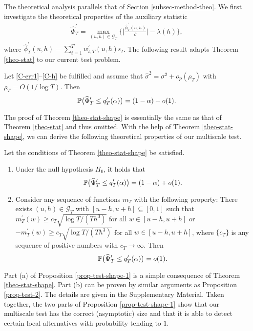 The theoretical analysis parallels that of Section \ref{subsec-method-theo}. We first investigate the theoretical properties of the auxiliary statistic 
\begin{align*}
\widehat{\Phi}_T^\prime = \max_{(u,h) \in \mathcal{G}_T} \Big\{ \Big| \frac{\widehat{\phi}_T^\prime(u,h)}{\widehat{\sigma}} \Big| - \lambda(h) \Big\}, 
\end{align*}
where $\widehat{\phi}_T^\prime(u,h) = \sum_{t=1}^T w_{t,T}^\prime(u,h) \varepsilon_t$. The following result adapts Theorem \ref{theo-stat} to our current test problem. 
\begin{theorem}\label{theo-stat-shape}
Let \ref{C-err1}--\ref{C-h} be fulfilled and assume that $\widehat{\sigma}^2 = \sigma^2 + o_p(\rho_T)$ with $\rho_T = O(1/\log T)$. Then
\[ \mathbb{P} \big( \widehat{\Phi}_T^\prime \le q_T^\prime(\alpha) \big) = (1 - \alpha) + o(1). \]
\end{theorem}
The proof of Theorem \ref{theo-stat-shape} is essentially the same as that of Theorem \ref{theo-stat} and thus omitted. With the help of Theorem \ref{theo-stat-shape}, we can derive the following theoretical properties of our multiscale test. 
\begin{prop}\label{prop-test-shape-1}
Let the conditions of Theorem \ref{theo-stat-shape} be satisfied. 
\begin{enumerate}[label=(\alph*),leftmargin=0.75cm]
\item Under the null hypothesis $H_0$, it holds that 
\[ \mathbb{P} \big( \widehat{\Psi}_T^\prime \le q_T^\prime(\alpha) \big) = (1 - \alpha) + o(1). \]
\item Consider any sequence of functions $m_T$ with the following property: There exists $(u,h) \in \mathcal{G}_T$ with $[u-h,u+h] \subseteq [0,1]$ such that $m_T^\prime(w) \ge c_T \sqrt{\log T/(Th^3)}$ for all $w \in [u-h,u+h]$ or $-m_T^\prime(w) \ge c_T \sqrt{\log T/(Th^3)}$ for all $w \in [u-h,u+h]$, where $\{c_T\}$ is any sequence of positive numbers with $c_T \rightarrow \infty$. Then 
\[ \mathbb{P} \big( \widehat{\Psi}_T^\prime \le q_T^\prime(\alpha) \big) = o(1). \]
\end{enumerate}
\end{prop}
Part (a) of Proposition \ref{prop-test-shape-1} is a simple consequence of Theorem \ref{theo-stat-shape}. Part (b) can be proven by similar arguments as Proposition \ref{prop-test-2}. The details are given in the Supplementary Material. Taken together, the two parts of Proposition \ref{prop-test-shape-1} show that our multiscale test has the correct (asymptotic) size and that it is able to detect certain local alternatives with probability tending to $1$. 
